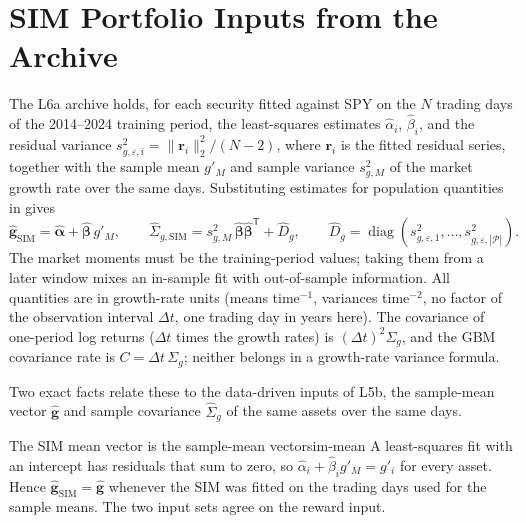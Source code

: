 \documentclass[11pt]{article}
\newcommand{\np}{|\mathcal P|}
\newcommand{\bg}{\mathbf g}
\newcommand{\bal}{\boldsymbol\alpha}
\newcommand{\bbe}{\boldsymbol\beta}
\newcommand{\br}{\mathbf r}
\newcommand{\SigSIM}{\hat\Sigma_{g,\mathrm{SIM}}}
\newcommand{\gSIM}{\hat{\bg}_{\mathrm{SIM}}}
\begin{document}
\section{SIM Portfolio Inputs from the Archive}

The L6a archive holds, for each security fitted against SPY on the $N$ trading days of the 2014--2024 training period, the least-squares estimates $\hat\alpha_i$, $\hat\beta_i$, and the residual variance $s^2_{g,\varepsilon,i}=\lVert\br_i\rVert_2^2/(N-2)$, where $\br_i$ is the fitted residual series, together with the sample mean $g'_M$ and sample variance $s^2_{g,M}$ of the market growth rate over the same days. Substituting estimates for population quantities in  gives
\begin{equation}
  \label{eq:sim-inputs}
  \gSIM=\hat{\bal}+\hat{\bbe}\,g'_M,
  \qquad
  \SigSIM=s^2_{g,M}\,\hat{\bbe}\hat{\bbe}^{\mathsf T}+\hat D_g,
  \qquad
  \hat D_g=\operatorname{diag}(s^2_{g,\varepsilon,1},\ldots,s^2_{g,\varepsilon,\np}).
\end{equation}
The market moments must be the training-period values; taking them from a later window mixes an in-sample fit with out-of-sample information. All quantities are in growth-rate units (means time$^{-1}$, variances time$^{-2}$, no factor of the observation interval $\Delta t$, one trading day in years here). The covariance of one-period log returns ($\Delta t$ times the growth rates) is $(\Delta t)^2\Sigma_g$, and the GBM covariance rate is $C=\Delta t\,\Sigma_g$; neither belongs in a growth-rate variance formula.

Two exact facts relate these to the data-driven inputs of L5b, the sample-mean vector $\hat{\bg}$ and sample covariance $\hat\Sigma_g$ of the same assets over the same days.

\begin{proposition}{The SIM mean vector is the sample-mean vector}{sim-mean}
A least-squares fit with an intercept has residuals that sum to zero, so $\hat\alpha_i+\hat\beta_i g'_M=g'_i$ for every asset. Hence $\gSIM=\hat{\bg}$ whenever the SIM was fitted on the trading days used for the sample means. The two input sets agree on the reward input.
\end{proposition}
\end{document}
